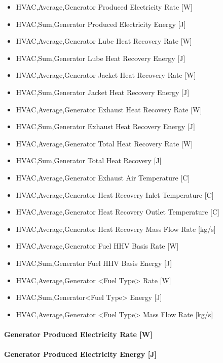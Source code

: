 \begin{itemize}
\item
  HVAC,Average,Generator Produced Electricity Rate {[}W{]}
\item
  HVAC,Sum,Generator Produced Electricity Energy {[}J{]}
\item
  HVAC,Average,Generator Lube Heat Recovery Rate {[}W{]}
\item
  HVAC,Sum,Generator Lube Heat Recovery Energy {[}J{]}
\item
  HVAC,Average,Generator Jacket Heat Recovery Rate {[}W{]}
\item
  HVAC,Sum,Generator Jacket Heat Recovery Energy {[}J{]}
\item
  HVAC,Average,Generator Exhaust Heat Recovery Rate {[}W{]}
\item
  HVAC,Sum,Generator Exhaust Heat Recovery Energy {[}J{]}
\item
  HVAC,Average,Generator Total Heat Recovery Rate {[}W{]}
\item
  HVAC,Sum,Generator Total Heat Recovery {[}J{]}
\item
  HVAC,Average,Generator Exhaust Air Temperature {[}C{]}
\item
  HVAC,Average,Generator Heat Recovery Inlet Temperature {[}C{]}
\item
  HVAC,Average,Generator Heat Recovery Outlet Temperature {[}C{]}
\item
  HVAC,Average,Generator Heat Recovery Mass Flow Rate {[}kg/s{]}
\item
  HVAC,Average,Generator Fuel HHV Basis Rate {[}W{]}
\item
  HVAC,Sum,Generator Fuel HHV Basis Energy {[}J{]}
\item
  HVAC,Average,Generator \textless{}Fuel Type\textgreater{} Rate {[}W{]}
\item
  HVAC,Sum,Generator\textless{}Fuel Type\textgreater{} Energy {[}J{]}
\item
  HVAC,Average,Generator \textless{}Fuel Type\textgreater{} Mass Flow Rate {[}kg/s{]}
\end{itemize}

\paragraph{Generator Produced Electricity Rate {[}W{]}}\label{generator-produced-electric-power-w}

\paragraph{Generator Produced Electricity Energy {[}J{]}}\label{generator-produced-electric-energy-j}


